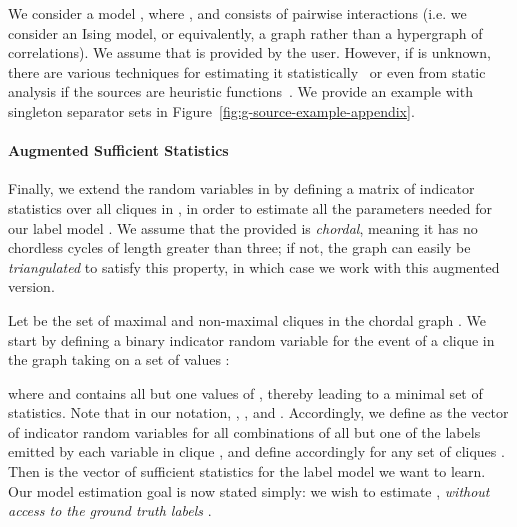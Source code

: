 \documentclass[letterpaper]{article}
\begin{document}
\begin{appendix}
We consider a model , where , and  consists of pairwise interactions (i.e. we consider an Ising model, or equivalently, a graph rather than a hypergraph of correlations).
We assume that  is provided by the user.
However, if  is unknown, there are various techniques for estimating it statistically~\cite{bach2017learning} or even from static analysis if the sources are heuristic functions~\cite{varma2017inferring}.
We provide an example  with singleton separator sets in Figure~\ref{fig:g-source-example-appendix}.

\paragraph*{Augmented Sufficient Statistics}
Finally, we extend the random variables in  by defining a matrix of indicator statistics over all cliques in , in order to estimate all the parameters needed for our label model .
We assume that the provided  is \textit{chordal}, meaning it has no chordless cycles of length greater than three; if not, the graph can easily be \emph{triangulated} to satisfy this property, in which case we work with this augmented version.

Let  be the set of maximal and non-maximal cliques in the chordal graph .
We start by defining a binary indicator random variable for the event of a clique  in the graph  taking on a set of values :

where  and  contains all but one values of , thereby leading to a minimal set of statistics.
Note that in our notation, , , and .
Accordingly, we define  as the vector of indicator random variables for all combinations of all but one of the labels emitted by each variable in clique , and define  accordingly for any set of cliques .
Then  is the vector of sufficient statistics for the label model we want to learn.
Our model estimation goal is now stated simply: we wish to estimate , \textit{without access to the ground truth labels} .


\end{appendix}
\end{document}
